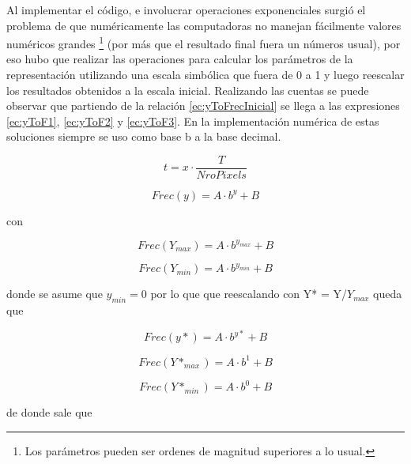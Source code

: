 \documentclass{article}
\begin{document}
    Al implementar el código, e involucrar operaciones exponenciales surgió el problema de que numéricamente las computadoras no manejan fácilmente valores numéricos grandes \footnote{Los parámetros pueden ser ordenes de magnitud superiores a lo usual.} (por más que el resultado final fuera un números usual), por eso hubo que realizar las operaciones para calcular los parámetros de la representación utilizando una escala simbólica que fuera de 0 a 1 y luego reescalar los resultados obtenidos a la escala inicial. Realizando las cuentas se puede observar que partiendo de la relación \ref{ec:yToFrecInicial} se llega a las expresiones  \ref{ec:yToF1}, \ref{ec:yToF2} y \ref{ec:yToF3}. En la implementación numérica de estas soluciones siempre se uso como base b a la base decimal.
    
    \begin{equation}
        \label{ec:xTot}
        t = x \cdot \frac{T}{NroPixels}
    \end{equation}
    
    \begin{equation}
        \label{ec:yToFrecInicial}
        Frec(y) = A \cdot b^{y} + B
    \end{equation}
    
    con 
    
    \begin{equation*}
        Frec(Y_{max}) = A \cdot b^{y_{max}} + B
    \end{equation*}
    
    \begin{equation*}
        Frec(Y_{min}) = A \cdot b^{y_{min}} + B
    \end{equation*}
    
    donde se asume que $y_{min}=0$ por lo que que reescalando con Y* = Y/$Y_{max}$ queda que
    
    \begin{equation*}
        Frec(y*) = A \cdot b^{y*} + B
    \end{equation*}
    
    \begin{equation*}
        Frec(Y*_{max}) = A \cdot b^{1} + B
    \end{equation*}
    
    \begin{equation*}
        Frec(Y*_{min}) = A \cdot b^{0} + B
    \end{equation*}
    
    de donde sale que 
    
\end{document}

